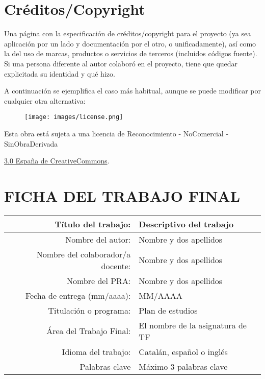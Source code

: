 \setcounter{page}{1} 
\pagestyle{plain}

\chapter*{Créditos/Copyright}

Una página con la especificación de créditos/copyright para el proyecto (ya sea aplicación por un lado y documentación por el otro, o unificadamente), así como la del uso de marcas, productos o servicios de terceros (incluidos códigos fuente). Si una persona diferente al autor colaboró en el proyecto, tiene que quedar explicitada su identidad y qué hizo.

A continuación se ejemplifica el caso más habitual, aunque se puede modificar por cualquier otra alternativa:

\vspace{1cm}

\begin{figure}[ht]
    \centering
	\texttt{[image: images/license.png]}
\end{figure}

Esta obra está sujeta a una licencia de Reconocimiento -  NoComercial - SinObraDerivada

\href{https://creativecommons.org/licenses/by-nc-nd/3.0/es/}{3.0 España de CreativeCommons}.

\chapter*{FICHA DEL TRABAJO FINAL}

\begin{table}[ht]
	\centering{}
	\renewcommand{\arraystretch}{2}
	\begin{tabular}{r | l}
		\hline
		Título del trabajo: & Descriptivo del trabajo\\
		\hline
        Nombre del autor: & Nombre y dos apellidos\\
		\hline
        Nombre del colaborador/a docente: & Nombre y dos apellidos\\
		\hline
        Nombre del PRA: & Nombre y dos apellidos\\
		\hline
        Fecha de entrega (mm/aaaa): & MM/AAAA\\
		\hline
        Titulación o programa: & Plan de estudios\\
		\hline
        Área del Trabajo Final: & El nombre de la asignatura de TF\\
		\hline
        Idioma del trabajo: & Catalán, español o inglés\\
		\hline
        Palabras clave & Máximo 3 palabras clave\\
		\hline
	\end{tabular}
\end{table}

